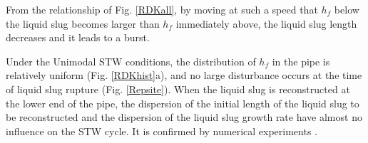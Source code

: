 \documentclass[aps,pre,preprint,groupedaddress,showkeys]{revtex4-2}
\begin{document}
From the relationship of Fig. \ref{RDKall}, by moving at such a speed that $h_f $ below the liquid slug becomes larger than $ h_f $ immediately above, the liquid slug length decreases and it leads to a burst.

Under the Unimodal STW conditions, the distribution of $ h_f $ in the pipe is relatively uniform (Fig. \ref{RDKhist}a), and no large disturbance occurs at the time of liquid slug rupture (Fig. \ref{Repsite}).
When the liquid slug is reconstructed at the lower end of the pipe, the dispersion of the initial length of the liquid slug to be reconstructed and the dispersion of the liquid slug growth rate have almost no influence on the STW cycle. 
It is confirmed by numerical experiments \citep{kanno2018}.

\end{document}
